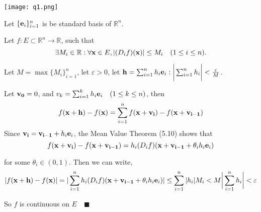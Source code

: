 \documentclass{article}
\newcommand\R{\mathbb{R}}
\begin{document}
\texttt{[image: q1.png]}


Let $\{\vb{e}_i\}_{i=1}^n$ is be standard basis of $\R^n$.

Let $f: E\subset \R^n\rightarrow \R$, such that
\[\exists M_i \in \R: \forall \vb{x} \in E,  |(D_i f)(\vb{x})|\leq
  M_i\quad  (1\leq i\leq n).\]

Let $M = \max \{M_i\}_{i=1}^n$, let $\varepsilon >0$, let $\vb{h} = \sum_{i= 1}^n h_i \vb{e}_i :
\bigg|\sum_{i=1}^n h_i\bigg| < \frac{\varepsilon}{M}$.

Let $\vb{v_0} = 0$, and $v_k = \sum_{i=1}^k h_i\vb{e}_i\quad (1\leq k
\leq n)$, then
\begin{equation}f(\vb{x}+\vb{h})-f(\vb{x}) = \sum_{i=1}^n
  f(\vb{x}+\vb{v_{i}}) - f(\vb{x}+\vb{v_{i-1}})\end{equation}
Since $\vb{v_i} = \vb{v_{i-1}}+h_i\vb{e}_i$, the Mean Value Theorem
(5.10) shows that
\[f(\vb{x}+\vb{v_{i}}) - f(\vb{x}+\vb{v_{i-1}}) = h_i(D_i f)(\vb{x}+
  \vb{v_{i-1}} + \theta_i h_i \vb{e}_i) \]

for some $\theta_i\in (0,1)$. Then we can write,
\[|f(\vb{x}+\vb{h})-f(\vb{x})| = |\sum_{i=1}^n
  h_i(D_i f)(\vb{x}+
  \vb{v_{i-1}} + \theta_i h_i \vb{e}_i)| \leq \sum_{i=1}^n
  |h_i|M_i < M\bigg|\sum_{i=1}^n h_i\bigg| < \varepsilon\]

So $f$ is continuous on $E\quad \blacksquare$
\end{document}
